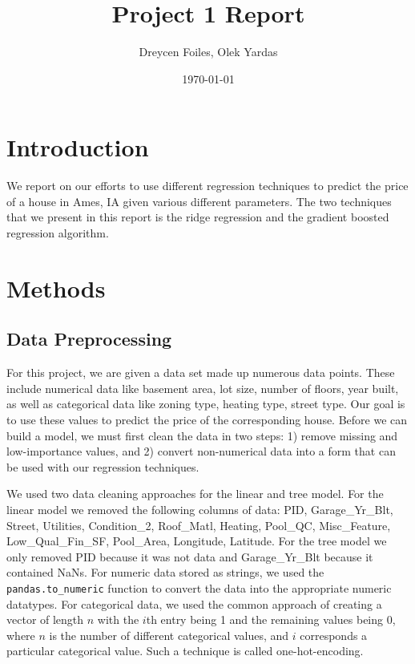 \documentclass{article}
\title{Project 1 Report}
\author{Dreycen Foiles, Olek Yardas}
\date{\today}
\begin{document}
\maketitle

\section{Introduction}

We report on our efforts to use different regression techniques to predict the price of a house in Ames, IA given various different parameters. The two techniques that we present in this report is the ridge regression and the gradient boosted regression algorithm.

\section{Methods}

\subsection{Data Preprocessing}
For this project, we are given a data set made up numerous data points. These
include numerical data like basement area,  lot size, number of floors, year
built, as well as categorical data like zoning type, heating type, street type.
Our goal is to use these values to predict the price of the corresponding house.
Before we can build a model, we must first clean the data in two steps:
1) remove missing and low-importance values, and 2) convert non-numerical data
into a form that can be used with our regression techniques. 

We used two data cleaning approaches for the linear and tree model. For the linear model 
we removed the following columns of data:
PID, Garage\_Yr\_Blt, Street, Utilities, Condition\_2, Roof\_Matl, Heating,
Pool\_QC, Misc\_Feature, \\ 
Low\_Qual\_Fin\_SF, Pool\_Area, Longitude, Latitude. For the 
tree model we only removed PID because it was not data and Garage\_Yr\_Blt because 
it contained NaNs. For numeric data stored as strings, we used the \verb,pandas.to_numeric, 
function to convert the data into the appropriate numeric datatypes. For
categorical data, we used the common approach of creating a vector of length
$n$ with the $i$th entry being 1 and the remaining values being 0, where $n$ is
the number of different categorical values, and $i$ corresponds a particular
categorical value. Such a technique is called one-hot-encoding. 
\end{document}

